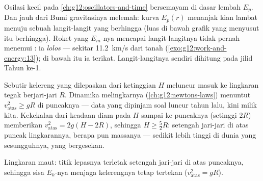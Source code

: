 \begin{remark}\label{rem:g12:work-and-energy:escape}
Osilasi kecil pada \cref{ch:g12:oscillators-and-time} bersemayam di
dasar lembah $E_p$. Dan jauh dari Bumi gravitasinya melemah: kurva
$E_p(r)$ menanjak kian lambat menuju sebuah langit-langit yang berhingga (luas
di bawah grafik  yang menyusut itu berhingga). Roket yang $E_m$-nya
mencapai langit-langitnya tidak pernah menemui : ia
\emph{lolos} --- sekitar \qty{11.2}{km/s} dari
tanah (\cref{exo:g12:work-and-energy:13}); di bawah itu ia
terikat. Langit-langitnya sendiri dihitung pada jilid Tahun ke-1.
\end{remark}

\begin{example}\label{ex:g12:work-and-energy:loop}
Sebutir kelereng yang dilepaskan dari ketinggian $H$ meluncur masuk ke lingkaran
tegak berjari-jari $R$. Dinamika melingkarnya (\cref{ch:g12:newtons-laws}) menuntut
$v_{\text{atas}}^2 \geq gR$ di puncaknya --- data yang dipinjam soal
 luncur tahun lalu, kini milik kita. Kekekalan dari keadaan diam pada $H$
sampai ke puncaknya (setinggi $2R$) memberikan $v_{\text{atas}}^2 = 2g(H - 2R)$, sehingga
$H \geq \tfrac52 R$: setengah jari-jari di atas puncak lingkarannya, berapa pun
massanya --- sedikit lebih tinggi di dunia yang sesungguhnya, yang bergesekan.
\end{example}

\begin{omfigure}

{\small Lingkaran maut: titik lepasnya terletak setengah jari-jari di atas puncaknya,
sehingga sisa $E_k$-nya menjaga kelerengnya tetap tertekan ($v_{\text{atas}}^2 = gR$).}
\end{omfigure}

